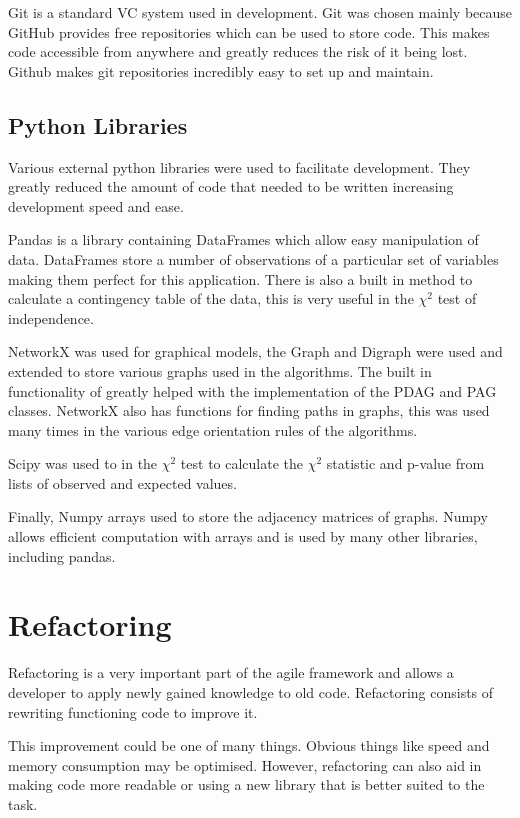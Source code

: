 \documentclass{UoYCSproject}
\begin{document}
Git is a standard VC system used in development. Git was chosen mainly because GitHub provides free repositories which can be used to store code. This makes code accessible from anywhere and greatly reduces the risk of it being lost. Github makes git repositories incredibly easy to set up and maintain.

\subsection{Python Libraries}
Various external python libraries were used to facilitate development. They greatly reduced the amount of code that needed to be written increasing development speed and ease.

Pandas is a library containing DataFrames which allow easy manipulation of data. DataFrames store a number of observations of a particular set of variables making them perfect for this application. There is also a built in method to calculate a contingency table of the data, this is very useful in the $\chi^2$ test of independence.

NetworkX was used for graphical models, the Graph and Digraph were used and extended to store various graphs used in the algorithms. The built in functionality of greatly helped with the implementation of the PDAG and PAG classes. NetworkX also has functions for finding paths in graphs, this was used many times in the various edge orientation rules of the algorithms.

Scipy was used to in the $\chi^2$ test to calculate the $\chi^2$ statistic and p-value from lists of observed and expected values.

Finally, Numpy arrays used to store the adjacency matrices of graphs. Numpy allows efficient computation with arrays and is used by many other libraries, including pandas.  

\section{Refactoring}
Refactoring is a very important part of the agile framework and allows a developer to apply newly gained knowledge to old code. Refactoring consists of rewriting functioning code to improve it.

This improvement could be one of many things. Obvious things like speed and memory consumption may be optimised. However, refactoring can also aid in making code more readable or using a new library that is better suited to the task.
\end{document}
